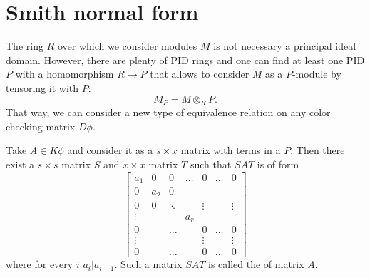 \section{Smith normal form}

%
The ring $R$ over which we consider modules $M$ is not necessary a principal ideal domain. However, there are plenty of PID rings and one can find at least one PID $P$ with a homomorphism $R\to P$ that allows to consider $M$ as a $P$-module by tensoring it with $P$:
$$M_P=M\otimes_R P.$$
That way, we can consider a new type of equivalence relation on any color checking matrix $D\phi$.
\begin{definition}
Take $A\in K\phi$ and consider it as a $s\times x$ matrix with terms in a $P$. Then there exist a $s\times s$ matrix $S$ and $x\times x$ matrix $T$ such that $SAT$ is of form
$$
\begin{bmatrix}
  a_1 & 0 & 0 & \hdots & 0 & \hdots & 0 \\ 
  0 & a_2 & 0\\ 
  0 & 0 & \ddots & & \vdots & & \vdots\\ 
  \vdots & & & a_r\\ 
  0 & & \hdots & & 0 & \hdots & 0 \\ 
  \vdots & & & & \vdots & & \vdots\\ 
  0 & & \hdots & & 0 & \hdots & 0
\end{bmatrix}
$$
where for every $i$ $a_i|a_{i+1}$. Such a matrix $SAT$ is called the  of matrix $A$.
\end{definition}

